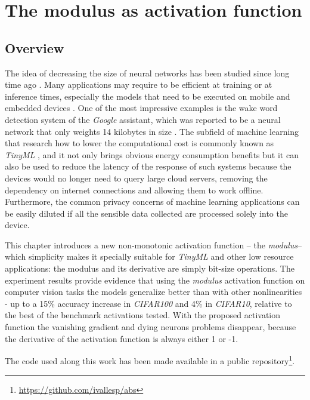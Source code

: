 \chapter{The modulus as activation function} \label{ch:modulus}

\section{Overview}
The idea of decreasing the size of neural networks has been studied since long time ago \autocite{lecun1989, hassibi1993, frankleC19}. Many applications may require to be efficient at training or at inference times, especially the models that need to be executed on mobile and embedded devices \autocite{ooko2021, zapico2021}. One of the most impressive examples is the wake word detection system of the \textit{Google} assistant, which was reported to be a neural network that only weights 14 kilobytes in size \autocite{warden2020}. The subfield of machine learning that research how to lower the computational cost is commonly known as \textit{TinyML} \autocite{han2022}, and it not only brings obvious energy consumption benefits but it can also be used to reduce the latency of the response of such systems because the devices would no longer need to query large cloud servers, removing the dependency on internet connections and allowing them to work offline. Furthermore, the common privacy concerns of machine learning applications \autocite{ha2019} can be easily diluted if all the sensible data collected are processed solely into the device.

This chapter introduces a new non-monotonic activation function -- the \textit{modulus}-- which simplicity makes it specially suitable for \textit{TinyML} and other low resource applications: the modulus and its derivative are simply bit-size operations. The experiment results provide evidence that using the \textit{modulus} activation function on computer vision tasks the models generalize better than with other nonlinearities - up to a 15\% accuracy increase in \textit{CIFAR100} and 4\% in \textit{CIFAR10}, relative to the best of the benchmark activations tested. With the proposed activation function the vanishing gradient and dying neurons problems disappear, because the derivative of the activation function is always either 1 or -1.



The code used along this work has been made available in a public repository\footnote{\url{https://github.com/ivallesp/abs}}.


